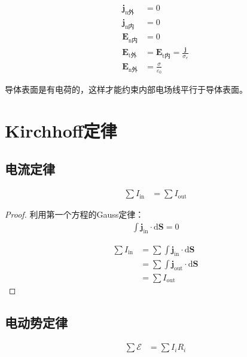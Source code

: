 \documentclass[12pt,onecolumn,a4paper]{book}
\numberwithin{table}{subsection}
\numberwithin{equation}{subsection}
\begin{document}
\begin{align}
    \mathbf{j}_\text{n外} & = 0                                                  \\
    \mathbf{j}_\text{n内} & = 0                                                  \\
    \mathbf{E}_\text{n内} & = 0                                                  \\
    \mathbf{E}_\text{t外} & = \mathbf{E}_\text{t内} = \frac{\mathbf{j}}{\sigma_e} \\
    \mathbf{E}_\text{n外} & = \frac{\sigma}{\varepsilon_0}
\end{align}

导体表面是有电荷的，这样才能约束内部电场线平行于导体表面。

\section{Kirchhoff定律}

\subsection{电流定律}

\begin{align}
    \sum I_\text{in} & = \sum I_\text{out}
\end{align}

\begin{proof}
    利用第一个方程的Gauss定律：
    \begin{align}
        \int \mathbf{j}_\text{in} \cdot \mathrm{d} \mathbf{S}  =0
    \end{align}

    \begin{align}
        \sum I_\text{in} & = \sum \int \mathbf{j}_\text{in} \cdot \mathrm{d} \mathbf{S}  \\
                         & = \sum \int \mathbf{j}_\text{out} \cdot \mathrm{d} \mathbf{S} \\
                         & = \sum I_\text{out}
    \end{align}
\end{proof}

\subsection{电动势定律}

\begin{align}
    \sum \mathcal{E} & = \sum I_iR_i
\end{align}
\end{document}
